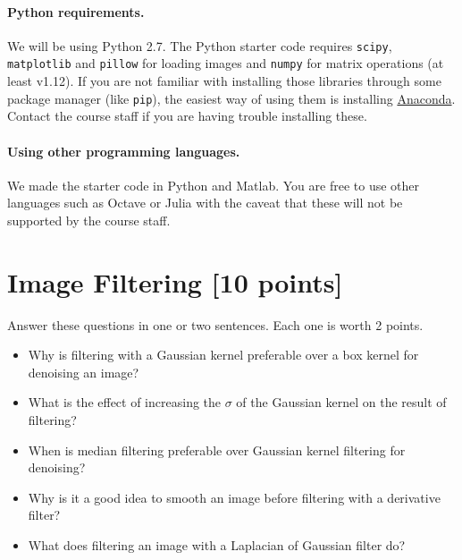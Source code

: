 \documentclass[10pt,letterpaper]{article}
\newcommand{\cmd}[1] {{\color{blue}\texttt{#1}}}
\begin{document}
\paragraph{Python requirements.} We will be using Python 2.7. The Python starter code requires \cmd{scipy}, \cmd{matplotlib} and \cmd{pillow} for loading images and \cmd{numpy} for matrix operations (at least v1.12). 
If you are not familiar with installing those libraries through some package manager (like \cmd{pip}), the easiest way of using them is installing \href{https://conda.io/docs/user-guide/install/index.html}{Anaconda}. Contact the course staff if you are having trouble installing these.

\paragraph{Using other programming languages.} We made the starter code in Python and Matlab. You are free to use other languages such as Octave or Julia with the caveat that these will not be supported by the course staff.


\newpage

\section{Image Filtering [10 points]}

Answer these questions in one or two sentences. Each one is worth 2 points.

\begin{itemize}
\item Why is filtering with a Gaussian kernel preferable over a box kernel for denoising an image?
\vspace{1.25in}

\item What is the effect of increasing the $\sigma$ of the Gaussian kernel on the result of filtering?
\vspace{1.25in}

\item When is median filtering preferable over Gaussian kernel filtering for denoising?
\vspace{1.25in}

\item Why is it a good idea to smooth an image before filtering with a derivative filter?
\vspace{1.25in}
\item What does filtering an image with a Laplacian of Gaussian filter do?
\vspace{1.5in}
\end{itemize}
\end{document}
